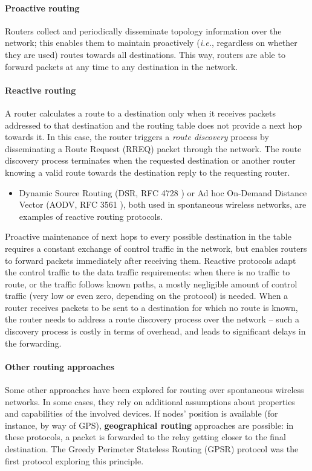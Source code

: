 \paragraph{Proactive routing} Routers collect and periodically disseminate topology information over the network; this enables them to maintain proactively (\emph{i.e.}, regardless on whether they are used) routes towards all destinations. This way, routers are able to forward packets at any time to any destination in the network.

\paragraph{Reactive routing} A router calculates a route to a destination only when it receives packets addressed to that destination and the routing table does not provide a next hop towards it. In this case, the router triggers a {\em route discovery} process by disseminating a Route Request (RREQ) packet through the network. The route discovery process terminates when the requested destination or another router knowing a valid route towards the destination reply to the requesting router.  
	\begin{itemize}
	\item Dynamic Source Routing (DSR, RFC 4728 \cite{rfc4728}) or Ad hoc On-Demand Distance Vector (AODV, RFC 3561 \cite{rfc3561}), both used in spontaneous wireless networks, are examples of reactive routing protocols. \\
	\end{itemize}

Proactive maintenance of next hops to every possible destination in the table requires a constant exchange of control traffic in the network, but enables routers to forward packets immediately after receiving them. Reactive protocols adapt the control traffic to the data traffic requirements: when there is no traffic to route, or the traffic follows known paths, a mostly negligible amount of control traffic (very low or even zero, depending on the protocol) is needed. When a router receives packets to be sent to a destination for which no route is known, the router needs to address a route discovery process over the network -- such a discovery process is costly in terms of overhead, and leads to significant delays in the forwarding.

\paragraph{Other routing approaches} Some other approaches have been explored for routing over spontaneous wireless networks. In some cases, they rely on additional assumptions about properties and capabilities of the involved devices. If nodes' position is available (for instance, by way of GPS), {\bf geographical routing} approaches are possible: in these protocols, a packet is forwarded to the relay getting closer to the final destination. The Greedy Perimeter Stateless Routing (GPSR) protocol \cite{gpsr} was the first protocol exploring this principle.

